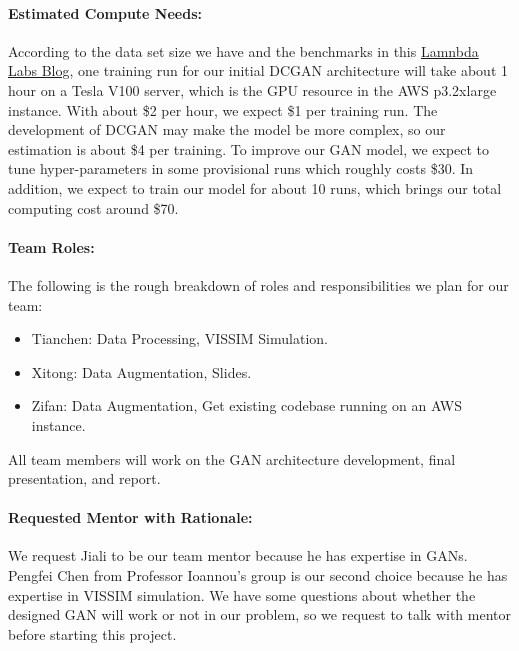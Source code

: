 \documentclass[11pt]{article}
\begin{document}
\paragraph{Estimated Compute Needs:}  According to the data set size we have and the benchmarks in this \href{https://lambdalabs.com/blog/titan-v-deep-learning-benchmarks/}{Lamnbda Labs Blog}, one training run for our initial DCGAN architecture will take about 1 hour on a Tesla V100 server, which is the GPU resource in the AWS p3.2xlarge instance. With about \$2 per hour, we expect \$1 per training run. The development of DCGAN may make the model be more complex, so our estimation is about \$4 per training. To improve our GAN model, we expect to tune hyper-parameters in some provisional runs which roughly costs \$30. In addition, we expect to train our model for about 10 runs, which brings our total computing cost around \$70.

\paragraph{Team Roles:} The following is the rough breakdown of roles and responsibilities we plan for our team:
\begin{itemize}
\item Tianchen: Data Processing, VISSIM Simulation.
\item Xitong: Data Augmentation, Slides.
\item Zifan: Data Augmentation, Get existing codebase running on an AWS instance.
\end{itemize}
All team members will work on the GAN architecture development, final presentation, and report.  


\paragraph{Requested Mentor with Rationale:} We request Jiali to be our team mentor because he has expertise in GANs. Pengfei Chen from Professor Ioannou’s group is our second choice because he has expertise in VISSIM simulation. We have some questions about whether the designed GAN will work or not in our problem, so we request to talk with mentor before starting this project. 


 
\end{document}
